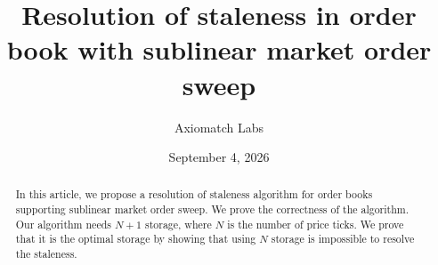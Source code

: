 \documentclass[11pt]{article}
\title{Resolution of staleness in order book with sublinear market order sweep}
\author{Axiomatch Labs}
\date{September 4, 2026}
\begin{document}
\maketitle

\begin{abstract}
    In this article, we propose a resolution of staleness algorithm for order books supporting sublinear market order sweep. We prove the correctness of the algorithm. Our algorithm needs $N+1$ storage, where $N$ is the number of price ticks. We prove that it is the optimal storage by showing that using $N$ storage is impossible to resolve the staleness.
\end{abstract}







\printbibliography
\end{document}

